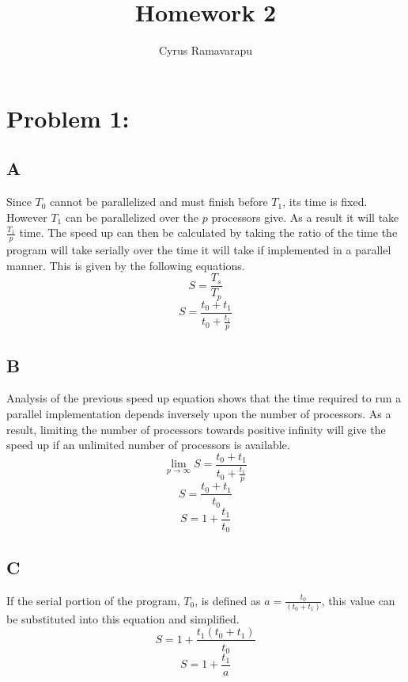 \documentclass{article}
\begin{document}
\title{Homework 2}
\author{Cyrus Ramavarapu}
\renewcommand{\today}{29 September 2016}
\maketitle

\section*{Problem 1:}
    \subsection*{A}
        Since $T_0$ cannot be parallelized and must finish before
        $T_1$, its time is fixed.  However $T_1$ can be parallelized
        over the $p$ processors give.  As a result it will take
        $\frac{T_1}{p}$ time.  The speed up can then be calculated
        by taking the ratio of the time the program will take serially
        over the time it will take if implemented in a parallel manner.
        This is given by the following equations.
        \[
            S = \frac{T_s}{T_p}
        \]
        \[
            S = \frac{t_0 + t_1}{t_0 + \frac{t_1}{p}}
        \]     
    \subsection*{B}
        Analysis of the previous speed up equation shows that the 
        time required to run a parallel implementation depends 
        inversely upon the number of processors.  As a result, limiting
        the number of processors towards positive infinity will give the
        speed up if an unlimited number of processors is available.
        \[
            \lim_{p\to\infty} S = \frac{t_0 + t_1}{t_0 + \frac{t_1}{p}}
        \]     
        \[
            S = \frac{t_0 + t_1}{t_0}
        \]     
        \[
            S = 1 + \frac{t_1}{t_0}
        \]     
    \subsection*{C}
        If the serial portion of the program, $T_0$, is defined as 
        $a = \frac{t_0}{(t_0 + t_1)}$, this value can be substituted
        into this equation and simplified.
        \[ 
            S = 1 + \frac{t_1(t_0+t_1)}{t_0}
        \]
        \[ 
            S = 1 + \frac{t_1}{a}
        \]
\end{document}
